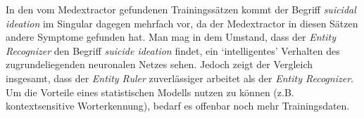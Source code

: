 In den vom Medextractor gefundenen Trainingssätzen kommt der Begriff \emph{suicidal ideation} im Singular dagegen mehrfach vor, da der Medextractor in diesen Sätzen andere Symptome gefunden hat. Man mag in dem Umstand, dass der \emph{Entity Recognizer} den Begriff \emph{suicide ideation} findet, ein `intelligentes' Verhalten des zugrundeliegenden neuronalen Netzes sehen. Jedoch zeigt der Vergleich insgesamt, dass der \emph{Entity Ruler} zuverlässiger arbeitet als der \emph{Entity Recognizer}. Um die Vorteile eines statistischen Modells nutzen zu können (z.B. kontextsensitive Worterkennung), bedarf es offenbar noch mehr Trainingsdaten.






